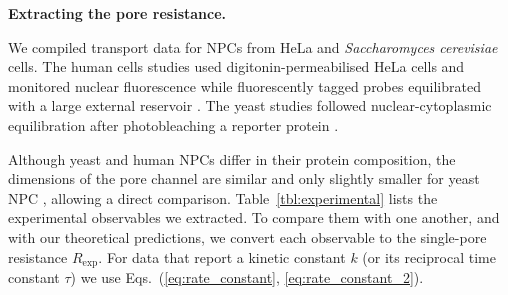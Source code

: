 \documentclass[10pt, a4paper]{article}
\begin{document}
\begin{multicols}{2}
\begin{table}[H]
        \caption{Transport-related quantities extracted from the experimental studies.}
        \label{tbl:experimental}
    \end{table}

\textbf{Extracting the pore resistance.}
    
We compiled transport data for NPCs from HeLa and \textit{Saccharomyces cerevisiae} cells.  
The human cells studies used digitonin-permeabilised HeLa cells and monitored nuclear fluorescence while fluorescently tagged probes equilibrated with a large external reservoir 
\cite{Ribbeck2001,Mohr2009,Frey2018}.  
The yeast studies followed nuclear-cytoplasmic equilibration after
photobleaching a reporter protein \cite{Popken2015,Timney2016}.

Although yeast and human NPCs differ in their protein composition, the dimensions of the pore channel are similar and only slightly smaller for yeast NPC \cite{Yang1998}, allowing a direct comparison.  
Table~\ref{tbl:experimental} lists the experimental observables we extracted. 
To compare them with one another, and with our theoretical predictions, we convert each observable to the single-pore resistance $R_{\text{exp}}$.  
For data that report a kinetic constant $k$ (or its reciprocal time constant $\tau$) we use Eqs.~(\ref{eq:rate_constant}, \ref{eq:rate_constant_2}).


\end{multicols}
\end{document}
